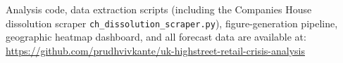 \documentclass[12pt,a4paper]{article}
\begin{document}
Analysis code, data extraction scripts (including the Companies House dissolution scraper
\texttt{ch\_dissolution\_scraper.py}), figure-generation pipeline, geographic heatmap
dashboard, and all forecast data are available at:
\url{https://github.com/prudhvivkante/uk-highstreet-retail-crisis-analysis}
\end{document}
